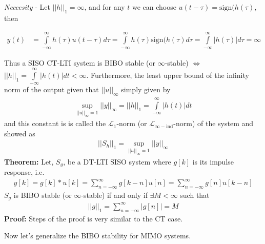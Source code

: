 \documentclass[twoside]{article}
\begin{document}
\textit{Neccesity} - Let $ || h ||_1 = \infty $, and for any $t$ we can choose $u(t - \tau) = \mathrm{sign}( h( \tau )$, then

\begin{align*}
	y(t) &= \int\limits_{-\infty}^{\infty} h(\tau) u(t - \tau) d\tau = 
	\int\limits_{-\infty}^{\infty} h(\tau) \mathrm{sign}( h( \tau ) d\tau = 
	\int\limits_{-\infty}^{\infty} | h(\tau) |  d\tau = \infty
\end{align*}

Thus a SISO CT-LTI system is  BIBO stable (or $\infty$-stable) $\iff$ $|| h ||_{1} = \int\limits_{-\infty}^{\infty} | h(t) | dt < \infty$.
Furthermore, the least upper bound of the infinity norm of the output given that $ || u ||_{\infty}$ simply given by 
%
\begin{align*}
	\underset{|| u ||_{\infty} = 1}{\sup} || y ||_{\infty} = || h ||_{1} = \int\limits_{-\infty}^{\infty} | h(t) | dt
\end{align*}
%
and this constant is is called the $\mathcal{L}_1$-norm (or $\mathcal{L}_{\infty-\mathrm{ind}}$-norm) of the system and showed as
%
\begin{align*}
	|| S_h ||_1 =  \underset{|| u ||_{\infty} = 1}{\sup} || y ||_{\infty} 
\end{align*}
%
\textbf{Theorem:} Let, $S_{g}$, be a DT-LTI SISO system where $g[k]$ is its impulse response, i.e.
%
\begin{align*}
y[k] = g[k] * u[k] = \sum\limits_{n=-\infty}^{\infty} g[k - n] u[n]  =  \sum\limits_{n=-\infty}^{\infty} g[n] u[k - n]  
\end{align*}
%
$S_{g}$ is BIBO stable (or $\infty$-stable) if and only if $\exists M < \infty$ such that 
%
\begin{align*}
	|| g ||_1 =  \sum\limits_{n=-\infty}^{\infty} | g[n] | = M
\end{align*}
%
\textbf{Proof:} Steps of the proof is very similar to the CT case. 

Now let's generalize the BIBO stability for MIMO systems. 
\end{document}

